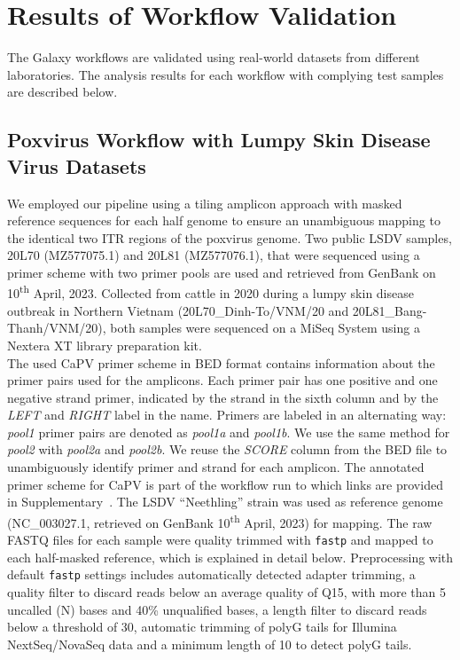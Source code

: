 \chapter{Results of Workflow Validation}\label{chap:results}
The Galaxy workflows are validated using real-world datasets from different laboratories. The analysis results for each workflow with complying test samples are described below.

\section{Poxvirus Workflow with Lumpy Skin Disease Virus Datasets}
We employed our pipeline using a tiling amplicon approach with masked reference sequences for each half genome to ensure an unambiguous mapping to the identical two \ac{ITR} regions of the poxvirus genome. Two public \ac{LSDV} samples, 20L70 (MZ577075.1) and 20L81 (MZ577076.1), that were sequenced using a primer scheme with two primer pools are used and retrieved from GenBank on 10\textsuperscript{th} April, 2023. Collected from cattle in 2020 during a lumpy skin disease outbreak in Northern Vietnam (20L70\_Dinh-To/VNM/20 and 20L81\_Bang-Thanh/VNM/20), both samples were sequenced on a MiSeq System using a Nextera XT library preparation kit. \\
The used \acs{CaPV} primer scheme in \ac{BED} format contains information about the primer pairs used for the amplicons. Each primer pair has one positive and one negative strand primer, indicated by the strand in the sixth column and by the \textit{LEFT} and \textit{RIGHT} label in the name. Primers are labeled in an alternating way: \textit{pool1} primer pairs are denoted as \textit{pool1a} and \textit{pool1b}. We use the same method for \textit{pool2} with \textit{pool2a} and \textit{pool2b}. We reuse the \textit{SCORE} column from the \ac{BED} file to unambiguously identify primer and strand for each amplicon. The annotated primer scheme for \ac{CaPV} is part of the workflow run to which links are provided in Supplementary~. The \ac{LSDV} ``Neethling'' strain was used as reference genome (NC\_003027.1, retrieved on GenBank 10\textsuperscript{th} April, 2023) for mapping. The raw FASTQ files for each sample were quality trimmed with \texttt{fastp} and mapped to each half-masked reference, which is explained in detail below. Preprocessing with default \texttt{fastp} settings includes automatically detected adapter trimming, a quality filter to discard reads below an average quality of Q15, with more than 5 uncalled (N) bases and 40\% unqualified bases, a length filter to discard reads below a threshold of 30, automatic trimming of polyG tails for Illumina NextSeq/NovaSeq data and a minimum length of 10 to detect polyG tails.
\\

